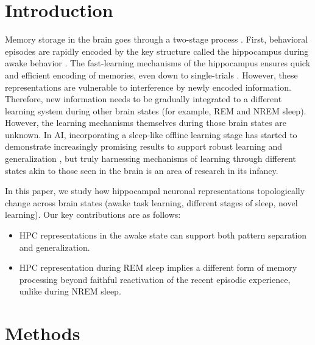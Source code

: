 \section{Introduction}

Memory storage in the brain goes through a two-stage process \citep{marr1971simple, buzsaki1989two}. First, behavioral episodes are rapidly encoded by the key structure called the hippocampus during awake behavior \citep{whittington2020tolman}. The fast-learning mechanisms of the hippocampus ensures quick and efficient encoding of memories, even down to single-trials \citep{tulving2002episodic}. However, these representations are vulnerable to interference by newly encoded information. Therefore, new information needs to be gradually integrated to a different learning system during other brain states (for example, REM and NREM sleep). However, the learning mechanisms themselves during those brain states are unknown. In AI, incorporating a sleep-like offline learning stage has started to demonstrate increasingly promising results to support robust learning and generalization \citep{hafner2022mastering, ellis2020dreamcoder, mnih2013playing, hinton1995wakesleep, sun2022contrastive}, but truly harnessing mechanisms of learning through different states akin to those seen in the brain is an area of research in its infancy.

In this paper, we study how hippocampal neuronal representations topologically change across brain states (awake task learning, different stages of sleep, novel learning). Our key contributions are as follows:
\begin{itemize}
    \item HPC representations in the awake state can support both pattern separation and generalization.
    \item HPC representation during REM sleep implies a different form of memory processing beyond faithful reactivation of the recent episodic experience, unlike during NREM sleep.
\end{itemize}

\section{Methods}

